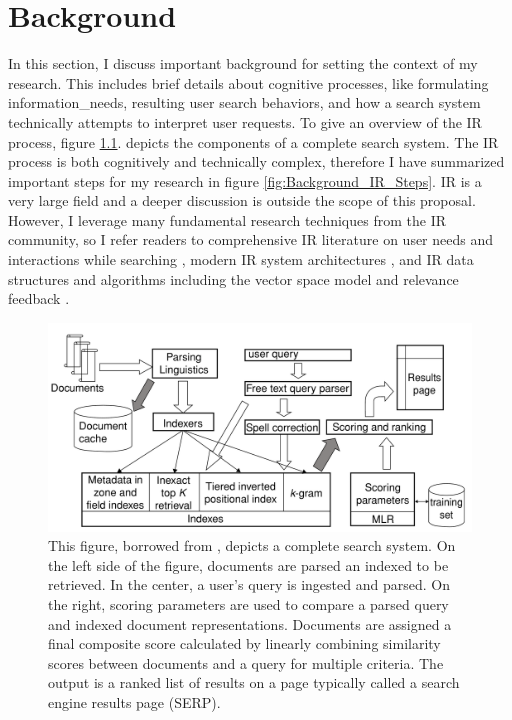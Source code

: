 \chapter{Background} \label{ch:[chapter 2 label]}

In this section, I discuss important background for setting the context of my research. This includes brief details about cognitive processes, like formulating \gls{information_needs}, resulting user search behaviors, and how a search system technically attempts to interpret user requests. To give an overview of the IR process, figure \ref{fig:Background_Complete_Search_System}. depicts the components of a complete search system. The IR  process is both cognitively and technically complex, therefore I have summarized important steps for my research in figure \ref{fig:Background_IR_Steps}. IR is a very large field and a deeper discussion is outside the scope of this proposal. However, I leverage many fundamental research techniques from the IR community, so I refer readers to comprehensive IR literature on user needs and interactions while searching \cite{White2016}, modern IR system architectures \cite{Baeza-Yates1999}, and IR data structures and algorithms including the vector space model and relevance feedback \cite{Buckley1985}.

\begin{figure}
    \centering
    \includegraphics[width=1\textwidth]{../figures/Background_Complete_Search_System.png}
    \caption{This figure, borrowed from \cite{Manning2008}, depicts a complete search system. On the left side of the figure, documents are parsed an indexed to be retrieved. In the center, a user’s query is ingested and parsed. On the right, scoring parameters are used to compare a parsed query and indexed document representations. Documents are assigned a final composite score calculated by linearly combining similarity scores between documents and a query for multiple criteria. The output is a ranked list of results on a page typically called a search engine results page (SERP).}
    \label{fig:Background_Complete_Search_System}
\end{figure}


